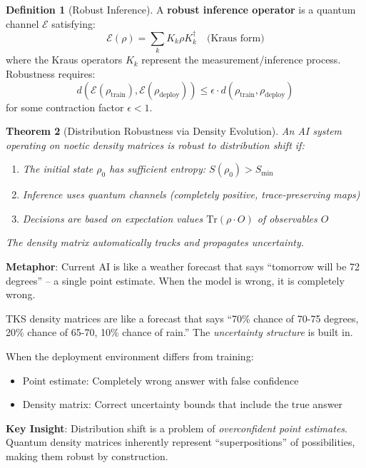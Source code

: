 \documentclass[11pt,twoside]{article}
\theoremstyle{definition}
\newtheorem{definition}{Definition}[section]
\theoremstyle{plain}
\newtheorem{theorem}[definition]{Theorem}
\theoremstyle{remark}
\newcommand{\DensityMat}{\rho}
\newcommand{\Trace}{\mathrm{Tr}}
\begin{document}
\begin{definition}[Robust Inference]
\label{def:robust-inference}
A \textbf{robust inference operator} is a quantum channel $\mathcal{E}$ satisfying:
\[
\mathcal{E}(\DensityMat) = \sum_k K_k \DensityMat K_k^\dagger \quad \text{(Kraus form)}
\]
where the Kraus operators $K_k$ represent the measurement/inference process. Robustness
requires:
\[
d(\mathcal{E}(\DensityMat_{\mathrm{train}}), \mathcal{E}(\DensityMat_{\mathrm{deploy}})) \leq
\epsilon \cdot d(\DensityMat_{\mathrm{train}}, \DensityMat_{\mathrm{deploy}})
\]
for some contraction factor $\epsilon < 1$.
\end{definition}

\begin{theorem}[Distribution Robustness via Density Evolution]
\label{thm:robustness}
An AI system operating on noetic density matrices is robust to distribution shift if:
\begin{enumerate}
  \item The initial state $\DensityMat_0$ has sufficient entropy: $S(\DensityMat_0) > S_{\min}$
  \item Inference uses quantum channels (completely positive, trace-preserving maps)
  \item Decisions are based on expectation values $\Trace(\DensityMat \cdot O)$ of observables $O$
\end{enumerate}
The density matrix automatically tracks and propagates uncertainty.
\end{theorem}

\begin{tcolorbox}[colback=green!5!white,colframe=green!60!black,title=\textbf{Plain English: How Density Matrices Handle Distribution Shift}]
\textbf{Metaphor}: Current AI is like a weather forecast that says ``tomorrow will be
72 degrees'' -- a single point estimate. When the model is wrong, it is completely wrong.

TKS density matrices are like a forecast that says ``70\% chance of 70-75 degrees,
20\% chance of 65-70, 10\% chance of rain.'' The \emph{uncertainty structure} is built in.

When the deployment environment differs from training:
\begin{itemize}
  \item Point estimate: Completely wrong answer with false confidence
  \item Density matrix: Correct uncertainty bounds that include the true answer
\end{itemize}

\textbf{Key Insight}: Distribution shift is a problem of \emph{overconfident point
estimates}. Quantum density matrices inherently represent ``superpositions'' of
possibilities, making them robust by construction.
\end{tcolorbox}
\end{document}
